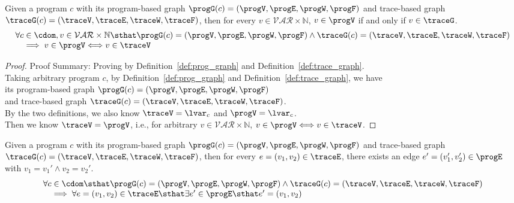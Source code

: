 \begin{lem}
	\label{lem:vertex_map}
	Given a program $c$ with its
	program-based graph $\progG({c}) = (\progV, \progE, \progW, \progF)$
	and 
	trace-based graph $\traceG({c}) = (\traceV, \traceE, \traceW, \traceF)$,
	then for every $v \in \mathcal{VAR} \times \mathbb{N}$,
	$v \in \progV$ if and only if $v \in \traceG$.
	\[
	\begin{array}{l}
	\forall c \in \cdom , v \in \mathcal{VAR} \times \mathbb{N} \sthat  
	\progG({c}) = (\progV, \progE, \progW, \progF)
	\land 
	\traceG({c}) = (\traceV, \traceE, \traceW, \traceF)
	\\ \quad
	\implies
	v \in \progV \Longleftrightarrow v \in \traceV
	\end{array}
	\]
	\end{lem}
\begin{proof}
Proof Summary: Proving by Definition~\ref{def:prog_graph} and Definition~\ref{def:trace_graph}.
\\
Taking arbitrary program $c$,
by Definition~\ref{def:prog_graph} and Definition~\ref{def:trace_graph}, 
we have   
\\
its program-based graph $\progG({c}) = (\progV, \progE, \progW, \progF)$ 
\\
and 
trace-based graph $\traceG({c}) = (\traceV, \traceE, \traceW, \traceF)$.
\\
By the two definitions, we also know 
$\traceV  = \lvar_c$ and $\progV = \lvar_c$.
\\
Then we know $\traceV  = \progV$, i.e., 
for arbitrary $v \in \mathcal{VAR} \times \mathbb{N}$, $v \in \progV \Longleftrightarrow v \in \traceV$.
\end{proof}
%
	\begin{lem}
	\label{lem:edge_map}
	Given a program $c$ with its
	program-based graph $\progG({c}) = (\progV, \progE, \progW, \progF)$
	and 
	trace-based graph $\traceG({c}) = (\traceV, \traceE, \traceW, \traceF)$,
	then for every $e = (v_1, v_2) \in \traceE$, there exists an edge 
	$e' = (v_1', v_2') \in \progE$ with 
	$v_1 = v_1' \land v_2 = v_2'$.
	\[
	\begin{array}{l}
	\forall c \in \cdom \sthat 
	 \progG({c}) = (\progV, \progE, \progW, \progF)
	\land 
	\traceG({c}) = (\traceV, \traceE, \traceW, \traceF)
	\\ \quad
	\implies
	\forall e = (v_1, v_2) \in \traceE
	\sthat  
	\exists e' \in \progE \sthat  e' = (v_1, v_2)
	\end{array}
	\]
	\end{lem}
